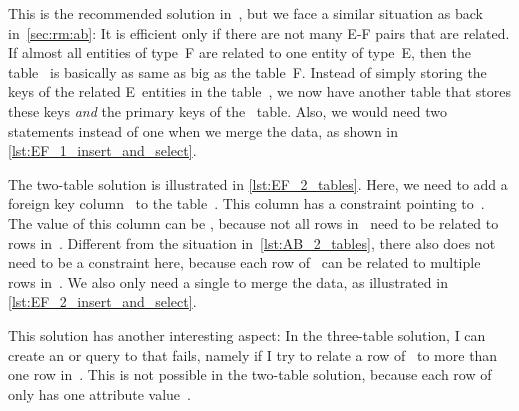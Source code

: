 This is the recommended solution in~\cite{S2024D:MEDTRDM}, but we face a similar situation as back in~\cref{sec:rm:ab}:
It is efficient only if there are not many E\nobreakdashes-F pairs that are related.
If almost all entities of type~F are related to one entity of type~E, then the table~ is basically as same as big as the table~F.
Instead of simply storing the keys of the related E~entities in the table~, we now have another table that stores these keys \emph{and} the primary keys of the ~table.
Also, we would need two  statements instead of one when we merge the data, as shown in \cref{lst:EF_1_insert_and_select}.

The two-table solution is illustrated in \cref{lst:EF_2_tables}.
Here, we need to add a foreign key column~ to the table~.
This column has a  constraint pointing to~.
The value of this column can be , because not all rows in~ need to be related to rows in~.
Different from the  situation in~\cref{lst:AB_2_tables}, there also does not need to be a  constraint here, because each row of~ can be related to multiple rows in~.
We also only need a single  to merge the data, as illustrated in \cref{lst:EF_2_insert_and_select}.

This solution has another interesting aspect:
In the three-table solution, I can create an  or  query to  that fails, namely if I try to relate a row of~ to more than one row in~.
This is not possible in the two-table solution, because each row of~ only has one attribute value~.%
%
\FloatBarrier%
\endhsection%
%
